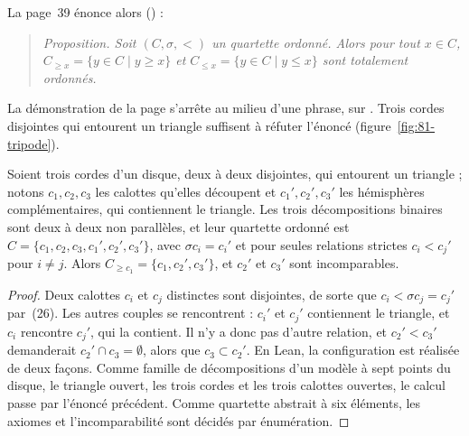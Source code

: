 La page~39 énonce alors () :
\begin{quote}
\emph{Proposition. Soit $(C, \sigma, <)$ un quartette ordonné. Alors pour tout $x \in C$, $C_{\geqslant x} = \{y \in C \mid y \geqslant x\}$ et $C_{\leqslant x} = \{y \in C \mid y \leqslant x\}$ sont totalement ordonnés.}
\end{quote}
La démonstration de la page s'arrête au milieu d'une phrase, sur . Trois cordes disjointes qui entourent un triangle suffisent à réfuter l'énoncé (figure~\ref{fig:81-tripode}).

\begin{encadre}
\begin{contrexemple}
Soient trois cordes d'un disque, deux à deux disjointes, qui entourent un triangle ; notons $c_1, c_2, c_3$ les calottes qu'elles découpent et $c_1', c_2', c_3'$ les hémisphères complémentaires, qui contiennent le triangle. Les trois décompositions binaires sont deux à deux non parallèles, et leur quartette ordonné est $C = \{c_1, c_2, c_3, c_1', c_2', c_3'\}$, avec $\sigma c_i = c_i'$ et pour seules relations strictes $c_i < c_j'$ pour $i \neq j$. Alors $C_{\geqslant c_1} = \{c_1, c_2', c_3'\}$, et $c_2'$ et $c_3'$ sont incomparables.
\end{contrexemple}
\end{encadre}

\begin{proof}
Deux calottes $c_i$ et $c_j$ distinctes sont disjointes, de sorte que $c_i < \sigma c_j = c_j'$ par~(26). Les autres couples se rencontrent : $c_i'$ et $c_j'$ contiennent le triangle, et $c_i$ rencontre $c_j'$, qui la contient. Il n'y a donc pas d'autre relation, et $c_2' < c_3'$ demanderait $c_2' \cap c_3 = \emptyset$, alors que $c_3 \subset c_2'$. En Lean, la configuration est réalisée de deux façons. Comme famille de décompositions d'un modèle à sept points du disque, le triangle ouvert, les trois cordes et les trois calottes ouvertes, le calcul passe par l'énoncé précédent. Comme quartette abstrait à six éléments, les axiomes et l'incomparabilité sont décidés par énumération.
\end{proof}

